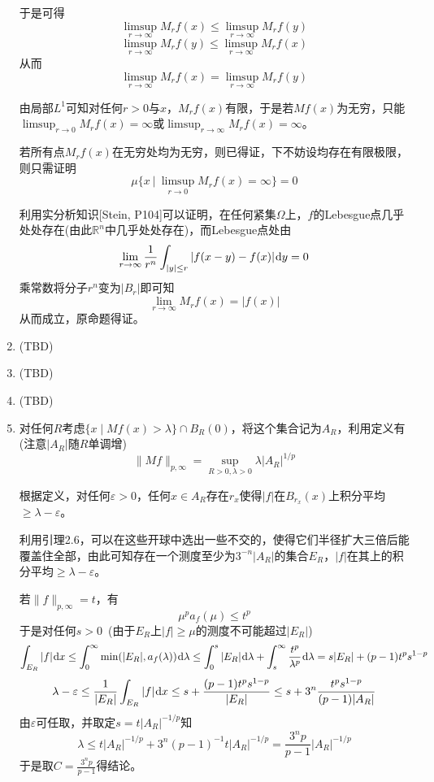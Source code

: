 \documentclass[a4paper,UTF8,fontset=windows]{ctexart}
\newcommand*{\dr}{\hspace{0.07em}\mathrm{d}}
\begin{document}
\begin{enumerate}
    于是可得
    $$\limsup_{r\to\infty}M_rf(x)\le\limsup_{r\to\infty}M_rf(y)$$
    $$\limsup_{r\to\infty}M_rf(y)\le\limsup_{r\to\infty}M_rf(x)$$
    从而
    $$\limsup_{r\to\infty}M_rf(x)=\limsup_{r\to\infty}M_rf(y)$$

    由局部$L^1$可知对任何$r>0$与$x$，$M_rf(x)$有限，于是若$Mf(x)$为无穷，只能$\limsup_{r\to 0}M_rf(x)=\infty$或$\limsup_{r\to\infty}M_rf(x)=\infty$。

    若所有点$M_rf(x)$在无穷处均为无穷，则已得证，下不妨设均存在有限极限，则只需证明
    $$\mu\bigg\{x\ \bigg|\ \limsup_{r\to 0}M_rf(x)=\infty\bigg\}=0$$

    利用实分析知识[Stein, P104]可以证明，在任何紧集$\Omega$上，$f$的Lebesgue点几乎处处存在(由此$\mathbb{R}^n$中几乎处处存在)，而Lebesgue点处由
    $$\lim_{r\to\infty}\frac{1}{r^n}\int_{|y|\le r}|f(x-y)-f(x)|\dr y=0$$
    乘常数将分子$r^n$变为$|B_r|$即可知
    $$\lim_{r\to\infty}M_rf(x)=|f(x)|$$
    从而成立，原命题得证。

    \item (TBD)
    \item (TBD)
    \item (TBD)
    
    \item 对任何$R$考虑$\{x\mid Mf(x)>\lambda\}\cap B_R(0)$，将这个集合记为$A_R$，利用定义有(注意$|A_R|$随$R$单调增)
    $$\|Mf\|_{p,\infty}=\sup_{R>0,\lambda>0}\lambda|A_R|^{1/p}$$

    根据定义，对任何$\varepsilon>0$，任何$x\in A_R$存在$r_x$使得$|f|$在$B_{r_x}(x)$上积分平均$\ge\lambda-\varepsilon$。
    
    利用引理2.6，可以在这些开球中选出一些不交的，使得它们半径扩大三倍后能覆盖住全部，由此可知存在一个测度至少为$3^{-n}|A_R|$的集合$E_R$，$|f|$在其上的积分平均$\ge\lambda-\varepsilon$。

    若$\|f\|_{p,\infty}=t$，有
    $$\mu^pa_f(\mu)\le t^p$$
    于是对任何$s>0$\ (由于$E_R$上$|f|\ge \mu$的测度不可能超过$|E_R|$)
    $$\int_{E_R}|f|\dr x\le\int_0^\infty\min(|E_R|,a_f(\lambda))\dr\lambda\le\int_0^s|E_R|\dr\lambda+\int_s^\infty\frac{t^p}{\lambda^p}\dr\lambda=s|E_R|+(p-1)t^ps^{1-p}$$
    $$\lambda-\varepsilon\le\frac{1}{|E_R|}\int_{E_R}|f|\dr x\le s+\frac{(p-1)t^ps^{1-p}}{|E_R|}\le s+3^n\frac{t^ps^{1-p}}{(p-1)|A_R|}$$
    由$\varepsilon$可任取，并取定$s=t|A_R|^{-1/p}$知
    $$\lambda\le t|A_R|^{-1/p}+3^n(p-1)^{-1}t|A_R|^{-1/p}=\frac{3^np}{p-1}|A_R|^{-1/p}$$
    于是取$C=\frac{3^np}{p-1}$得结论。


\end{enumerate}
\end{document}
